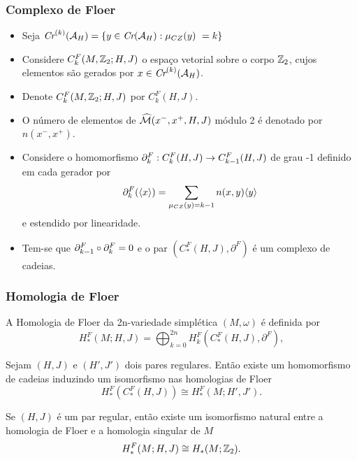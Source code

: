 \documentclass{beamer}
\begin{document}
	\begin{frame}
		\frametitle{Complexo de Floer}
		\begin{footnotesize}
				
			\begin{itemize}
				\item Seja $
				\textit{Cr}^{(k)}(\mathcal{A}_{H}) = \{ y \in \textit{Cr}(\mathcal{A}_{H}): \mu_{CZ}(y) \ =	 k\}$
				
				\item Considere $C^{F}_{k}(M, \mathbb{Z}_{2}; H,J)$ o espaço vetorial sobre o corpo $\mathbb{Z}_{2}$, cujos elementos são gerados por $x \in \textit{Cr}^{(k)}(\mathcal{A}_{H}) $.
				
				\item Denote $C^{F}_{k}(M, \mathbb{Z}_{2}; H,J)$  por $C^{F}_{k}(H,J)$.
				
				\item O número de elementos de $\widehat{\mathcal{M}}(x^{-}, x^{+}, H, J)$ módulo 2 é denotado por $n(x^{-},x^{+})$.
				
				\item 
				Considere o homomorfismo $\partial_{k}^{F}: C^{F}_{k}(H,J)\to C^{F}_{k-1}(H,J)$ de grau -1 definido em cada gerador por
				$$
				\partial_{k}^{F}(\langle x\rangle) = \sum_{\mu_{CZ}(y)=k-1}n(x,y)\langle y\rangle
				$$
				e estendido por linearidade. 
				
				\item Tem-se que $\partial_{k-1}^{F}\circ\partial_{k}^{F} = 0$ e o par $(C^{F}_{*}(H,J), \partial^{F})$ é um complexo de cadeias.
			\end{itemize}
		
		\end{footnotesize}
		
	\end{frame}
	
	\begin{frame}
		\frametitle{Homologia de Floer}
		\begin{footnotesize}
			A Homologia de Floer da 2n-variedade simplética $(M,\omega)$ é definida por 
			$$
			H^{F}_{*}(M;H,J)=\bigoplus_{k=0}^{2n}H^{F}_{k}(C^{F}_{*}(H,J), \partial^{F}),
			$$
			
			\begin{teorema}
				Sejam $(H,J)$ e $(H',J')$ dois pares regulares. Então existe um homomorfismo de cadeias induzindo um isomorfismo nas homologias de Floer
				$$
				H^{F}_{*}(C^{F}_{*}(H,J)) \cong H^{F}_{*}(M; H',J'). 
				$$
			\end{teorema}
			
			\begin{teorema}\label{teorema_isomorfismo_homologia_floer}
				Se $(H,J)$ é um par regular, então 
				existe um isomorfismo natural entre a homologia de Floer e a homologia singular de $M$
				$$
				H^{F}_{*}(M;H,J) \cong H_{*}(M;\mathbb{Z}_{2}). 
				$$
				
			\end{teorema}
		\end{footnotesize}	
			
	\end{frame}
	
\end{document}
